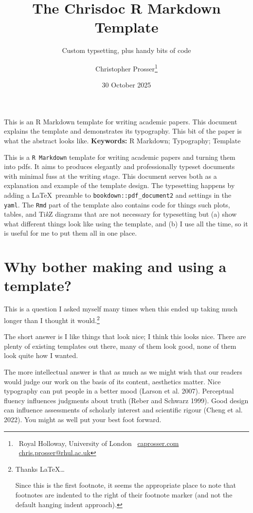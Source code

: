 \documentclass[
  a4paper,
  twoside]{article}
\title{The Chrisdoc R Markdown Template}
\subtitle{Custom typsetting, plus handy bits of code}
\author{Christopher Prosser\footnote{\faUniversity~Royal Holloway, University of London\newline
  \faGlobe~\href{https://caprosser.com/}{caprosser.com}\newline
  \faEnvelope~\href{mailto:chris.prosser@rhul.ac.uk}{chris.prosser@rhul.ac.uk}}}
\date{30 October 2025}
\renewenvironment{abstract}{%
  \par\vspace{0.25\baselineskip}%
  \begingroup\setlength{\parindent}{0pt}\noindent\ignorespaces
}{%
  \par\endgroup\vspace{0.5\baselineskip}%
  \thispagestyle{cover}%
  \clearpage
  \pagenumbering{arabic}\setcounter{page}{1}%
}
\begin{document}
\maketitle
\begin{abstract}
This is an R Markdown template for writing academic papers. This document explains the template and demonstrates its typography. This bit of the paper is what the abstract looks like. \newline \newline \textbf{Keywords:} R Markdown; Typography; Template
\end{abstract}

This is a \texttt{R\ Markdown} template for writing academic papers and turning them into pdfs. It aims to produces elegantly and professionally typeset documents with minimal fuss at the writing stage. This document serves both as a explanation and example of the template design. The typesetting happens by adding a \LaTeX~preamble to \texttt{bookdown::pdf\_document2} and settings in the \texttt{yaml}. The \texttt{Rmd} part of the template also contains code for things such plots, tables, and Ti\emph{k}Z diagrams that are not necessary for typesetting but (a) show what different things look like using the template, and (b) I use all the time, so it is useful for me to put them all in one place.

\section{Why bother making and using a template?}\label{why-bother-making-and-using-a-template}

This is a question I asked myself many times when this ended up taking much longer than I thought it would.\footnote{Thanks \LaTeX \ldots

  Since this is the first footnote, it seems the appropriate place to note that footnotes are indented to the right of their footnote marker (and not the default hanging indent approach).}

The short answer is I like things that look nice; I think this looks nice. There are plenty of existing templates out there, many of them look good, none of them look quite how I wanted.

The more intellectual answer is that as much as we might wish that our readers would judge our work on the basis of its content, aesthetics matter. Nice typography can put people in a better mood (Larson et al. 2007). Perceptual fluency influences judgments about truth (Reber and Schwarz 1999). Good design can influence assessments of scholarly interest and scientific rigour (Cheng et al. 2022). You might as well put your best foot forward.
\end{document}
